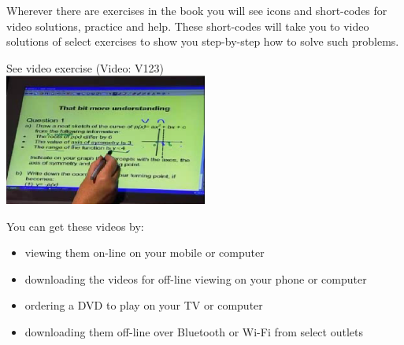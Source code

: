{\Large

Wherever there are exercises in the book you will see icons and short-codes for video solutions,
practice and help. These short-codes will take you to video solutions of select exercises to show you
step-by-step how to solve such problems. \par

\begin{center}
See video exercise  (Video: V123) \\
\includegraphics[width=0.5\textwidth]{title_images/mindsetexercise.eps}
\end{center}
\par
You can get these videos by:
\begin{itemize}
    \item viewing them on-line on your mobile or computer
    \item downloading the videos for off-line viewing on your phone or computer
    \item ordering a DVD to play on your TV or computer
    \item downloading them off-line over Bluetooth or Wi-Fi from select outlets
\end{itemize}
}


